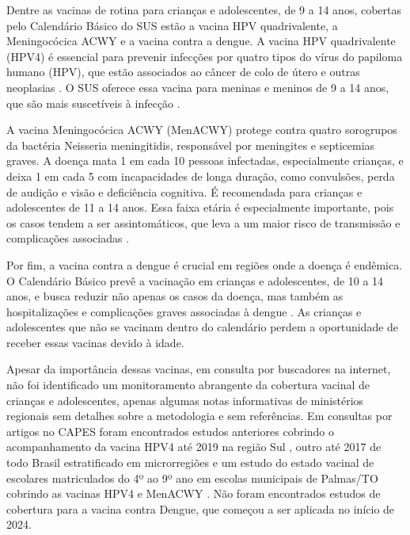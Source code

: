 \documentclass[12pt]{article}
\begin{document}
Dentre as vacinas de rotina para crianças e adolescentes, de 9 a 14 anos, cobertas pelo Calendário Básico do SUS estão a vacina HPV quadrivalente, a Meningocócica ACWY e a vacina contra a dengue. A vacina HPV quadrivalente (HPV4) é essencial para prevenir infecções por quatro tipos do vírus do papiloma humano (HPV), que estão associados ao câncer de colo de útero e outras neoplasias \cite{adames_hpv_2023}. O SUS oferece essa vacina para meninas e meninos de 9 a 14 anos, que são mais suscetíveis à infecção \cite{informe_ms_hpv4:2018} \cite{ms_risco_hpv_cancer:2024}.

A vacina Meningocócica ACWY (MenACWY) protege contra quatro sorogrupos da bactéria Neisseria meningitidis, responsável por meningites e septicemias graves. A doença mata 1 em cada 10 pessoas infectadas, especialmente crianças, e deixa 1 em cada 5 com incapacidades de longa duração, como convulsões, perda de audição e visão e deficiência cognitiva. É recomendada para crianças e adolescentes de 11 a 14 anos. Essa faixa etária é especialmente importante, pois os casos tendem a ser assintomáticos, que leva a um maior risco de transmissão e complicações associadas \cite{who_defeating_2021} \cite{ms_risco_meningite:2022}.

Por fim, a vacina contra a dengue é crucial em regiões onde a doença é endêmica. O Calendário Básico prevê a vacinação em crianças e adolescentes, de 10 a 14 anos, e busca reduzir não apenas os casos da doença, mas também as hospitalizações e complicações graves associadas à dengue \cite{ms_risco_dengue:2024}. As crianças e  adolescentes que não se vacinam dentro do calendário perdem a oportunidade de receber essas vacinas devido à idade.

Apesar da importância dessas vacinas, em consulta por buscadores na internet, não foi identificado um monitoramento abrangente da cobertura vacinal de crianças e  adolescentes, apenas algumas notas informativas de ministérios regionais sem detalhes sobre a metodologia e sem referências. Em consultas por artigos no CAPES foram encontrados estudos anteriores cobrindo o acompanhamento da vacina HPV4 até 2019 na região Sul \cite{adames_hpv_2023}, outro até 2017 de todo Brasil estratificado em microrregiões \cite{moura_cobertura_2021} e um estudo do estado vacinal de escolares matriculados do 4º ao 9º ano em escolas municipais de Palmas/TO cobrindo as vacinas HPV4 e MenACWY \cite{sousa_alencar_cantuaria_estado_2024}. Não foram encontrados estudos de cobertura para a vacina contra Dengue, que começou a ser aplicada no início de 2024.
\end{document}
